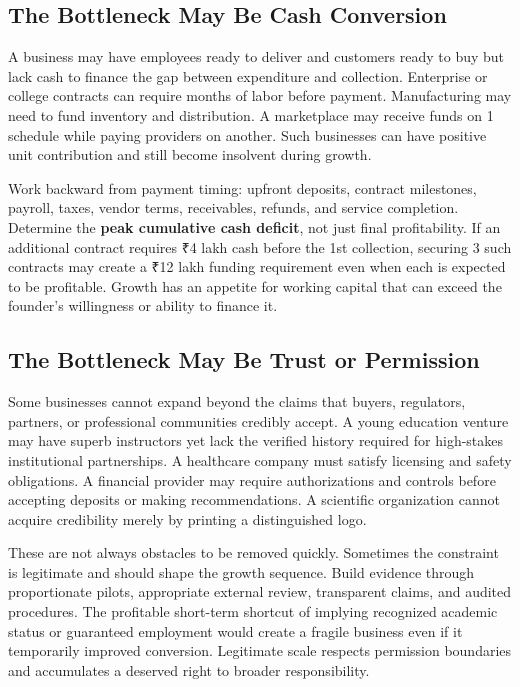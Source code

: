\subsection{The Bottleneck May Be Cash Conversion}
\label{sec:bottleneck_cash_conversion}

A business may have employees ready to deliver and customers ready to buy but lack cash to finance the gap between expenditure and collection. Enterprise or college contracts can require months of labor before payment. Manufacturing may need to fund inventory and distribution. A marketplace may receive funds on 1 schedule while paying providers on another. Such businesses can have positive unit contribution and still become insolvent during growth.

Work backward from payment timing: upfront deposits, contract milestones, payroll, taxes, vendor terms, receivables, refunds, and service completion. Determine the \textbf{peak cumulative cash deficit}, not just final profitability. If an additional contract requires ₹4 lakh cash before the 1st collection, securing 3 such contracts may create a ₹12 lakh funding requirement even when each is expected to be profitable. Growth has an appetite for working capital that can exceed the founder's willingness or ability to finance it.

\subsection{The Bottleneck May Be Trust or Permission}
\label{sec:bottleneck_trust_permission}

Some businesses cannot expand beyond the claims that buyers, regulators, partners, or professional communities credibly accept. A young education venture may have superb instructors yet lack the verified history required for high-stakes institutional partnerships. A healthcare company must satisfy licensing and safety obligations. A financial provider may require authorizations and controls before accepting deposits or making recommendations. A scientific organization cannot acquire credibility merely by printing a distinguished logo.

These are not always obstacles to be removed quickly. Sometimes the constraint is legitimate and should shape the growth sequence. Build evidence through proportionate pilots, appropriate external review, transparent claims, and audited procedures. The profitable short-term shortcut of implying recognized academic status or guaranteed employment would create a fragile business even if it temporarily improved conversion. Legitimate scale respects permission boundaries and accumulates a deserved right to broader responsibility.

